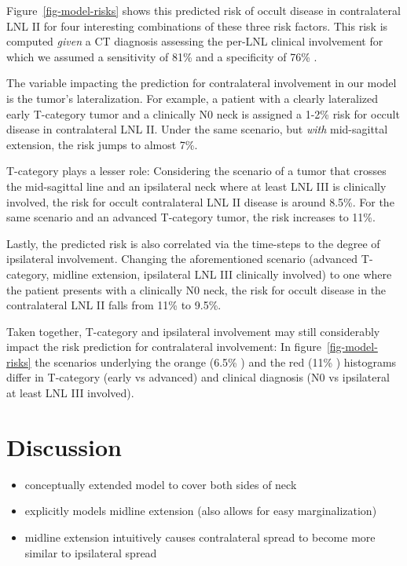 \documentclass[
  sn-mathphys-num,
]{sn-jnl}
\providecommand{\tightlist}{%
  \setlength{\itemsep}{0pt}\setlength{\parskip}{0pt}}\usepackage{longtable,booktabs,array}
\begin{document}
Figure~\ref{fig-model-risks} shows this predicted risk of occult disease
in contralateral LNL II for four interesting combinations of these three
risk factors. This risk is computed \emph{given} a CT diagnosis
assessing the per-LNL clinical involvement for which we assumed a
sensitivity of 81\% and a specificity of 76\%
\citep{debondt_detection_2007}.

The variable impacting the prediction for contralateral involvement in
our model is the tumor's lateralization. For example, a patient with a
clearly lateralized early T-category tumor and a clinically N0 neck is
assigned a 1-2\% risk for occult disease in contralateral LNL II. Under
the same scenario, but \emph{with} mid-sagittal extension, the risk
jumps to almost 7\%.

T-category plays a lesser role: Considering the scenario of a tumor that
crosses the mid-sagittal line and an ipsilateral neck where at least LNL
III is clinically involved, the risk for occult contralateral LNL II
disease is around 8.5\%. For the same scenario and an advanced
T-category tumor, the risk increases to 11\%.

Lastly, the predicted risk is also correlated via the time-steps to the
degree of ipsilateral involvement. Changing the aforementioned scenario
(advanced T-category, midline extension, ipsilateral LNL III clinically
involved) to one where the patient presents with a clinically N0 neck,
the risk for occult disease in the contralateral LNL II falls from 11\%
to 9.5\%.

Taken together, T-category and ipsilateral involvement may still
considerably impact the risk prediction for contralateral involvement:
In figure~\ref{fig-model-risks} the scenarios underlying the orange
(6.5\% ) and the red (11\% ) histograms differ in T-category (early vs
advanced) and clinical diagnosis (N0 vs ipsilateral at least LNL III
involved).

\section{Discussion}\label{discussion}

\begin{itemize}
\tightlist
\item
  conceptually extended model to cover both sides of neck
\item
  explicitly models midline extension (also allows for easy
  marginalization)
\item
  midline extension intuitively causes contralateral spread to become
  more similar to ipsilateral spread
\end{itemize}
\end{document}
